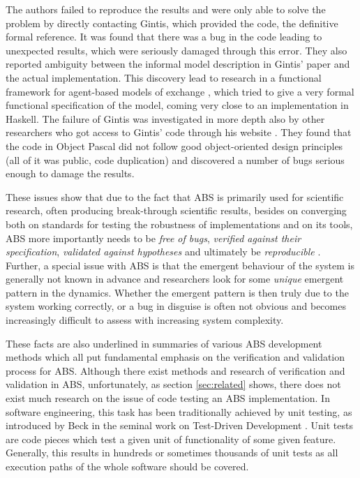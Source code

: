 The authors \cite{ionescu_dependently-typed_2012} failed to reproduce the results and were only able to solve the problem by directly contacting Gintis, which provided the code, the definitive formal reference. It was found that there was a bug in the code leading to unexpected results, which were seriously damaged through this error. They also reported ambiguity between the informal model description in Gintis' paper and the actual implementation. This discovery lead to research in a functional framework for agent-based models of exchange \cite{botta_functional_2011}, which tried to give a very formal functional specification of the model, coming very close to an implementation in Haskell. The failure of Gintis was investigated in more depth also by other researchers \cite{evensen_extensible_2010} who got access to Gintis' code through his website \cite{gintis_herbert_website}. They found that the code in Object Pascal did not follow good object-oriented design principles (all of it was public, code duplication) and discovered a number of bugs serious enough to damage the results.

These issues show that due to the fact that ABS is primarily used for scientific research, often producing break-through scientific results, besides on converging both on standards for testing the robustness of implementations and on its tools, ABS more importantly needs to be \textit{free of bugs}, \textit{verified against their specification}, \textit{validated against hypotheses} and ultimately be \textit{reproducible} \cite{axelrod_chapter_2006}. Further, a special issue with ABS is that the emergent behaviour of the system is generally not known in advance and researchers look for some \textit{unique} emergent pattern in the dynamics. Whether the emergent pattern is then truly due to the system working correctly, or a bug in disguise is often not obvious and becomes increasingly difficult to assess with increasing system complexity. 

These facts are also underlined in summaries of various ABS development methods \cite{hammer_tongs_north_2018} which all put fundamental emphasis on the verification and validation process for ABS. Although there exist methods and research of verification and validation in ABS, unfortunately, as section \ref{sec:related} shows, there does not exist much research on the issue of code testing an ABS implementation. In software engineering, this task has been traditionally achieved by unit testing, as introduced by Beck in the seminal work on Test-Driven Development \cite{beck_test_2002}. Unit tests are code pieces which test a given unit of functionality of some given feature. Generally, this results in hundreds or sometimes thousands of unit tests as all execution paths of the whole software should be covered.

